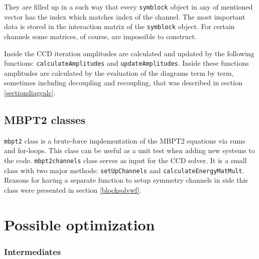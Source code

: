 \documentclass[twoside,english]{uiofysmaster}
\newcommand{\classname}[1]{\texttt{#1}}
\begin{document}
They are filled up in a such way that every \classname{symblock} object in any of mentioned vector has the index which matches index of the channel. The most important data is stored in the interaction matrix of the \classname{symblock} object. For certain channels some matrices, of course, are impossible to construct. 

Inside the CCD iteration amplitudes are calculated and updated by the following functions: \classname{calculateAmplitudes} and \classname{updateAmplitudes}. Inside these functions amplitudes are calculated by the evaluation of the diagrams term by term, sometimes including decoupling and recoupling, that was described in section \ref{sectiondiagcalc}.

     
\subsection{MBPT2 classes}
\classname{mbpt2} class is a brute-force implementation of the MBPT2 equations via sums and for-loops. This class can be useful as a unit test when adding new systems to the code.
\classname{mbpt2channels} class serves as input for the CCD solver. It is a small class with two major methods: \classname{setUpChannels} and \classname{calculateEnergyMatMult}. Reasons for having a separate function to setup symmetry channels in side this class were presented in section \ref{blocksolvwf}.

\section{Possible optimization}

\subsubsection{Intermediates}
\end{document}
